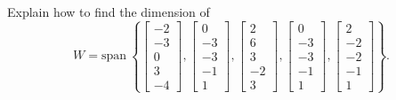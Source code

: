 \documentclass{article}
\begin{document}
\begin{exerciseStatement}
    Explain how to find the dimension of
\[W=\mathrm{span}\ \left\{\left[\begin{array}{r}
-2 \\
-3 \\
0 \\
3 \\
-4
\end{array}\right] , \left[\begin{array}{r}
0 \\
-3 \\
-3 \\
-1 \\
1
\end{array}\right] , \left[\begin{array}{r}
2 \\
6 \\
3 \\
-2 \\
3
\end{array}\right] , \left[\begin{array}{r}
0 \\
-3 \\
-3 \\
-1 \\
1
\end{array}\right] , \left[\begin{array}{r}
2 \\
-2 \\
-2 \\
-1 \\
1
\end{array}\right]\right\}.\]



  
\end{exerciseStatement}
\end{document}

